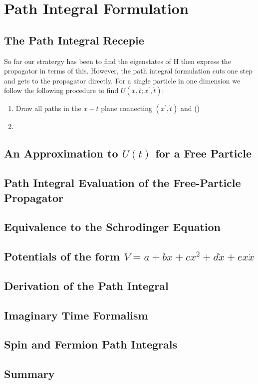 \chapter{Path Integral Formulation}
\section{The Path Integral Recepie}
So far our stratergy has been to find the eigenstates of H then express the propagator in terms of this. However, the path integral formulation cuts one step and gets to the propagator directly. For a single particle in one dimension we follow the following procedure to find $U(x,t;x^{'}, \dot{t})$:
\begin{enumerate}
	\item Draw all paths in the $x-t$ plane connecting $(x^{'}, \dot{t})$ and ()
	\item 
\end{enumerate}
\section{An Approximation to $U(t)$ for a Free Particle}
\section{Path Integral Evaluation of the Free-Particle Propagator}
\section{Equivalence to the Schrodinger Equation}
\section{Potentials of the form $V = a + bx + cx^{2} + d \dot{x} + ex \dot{x}$}
\section{Derivation of the Path Integral}
\section{Imaginary Time Formalism}
\section{Spin and Fermion Path Integrals}
\section{Summary}